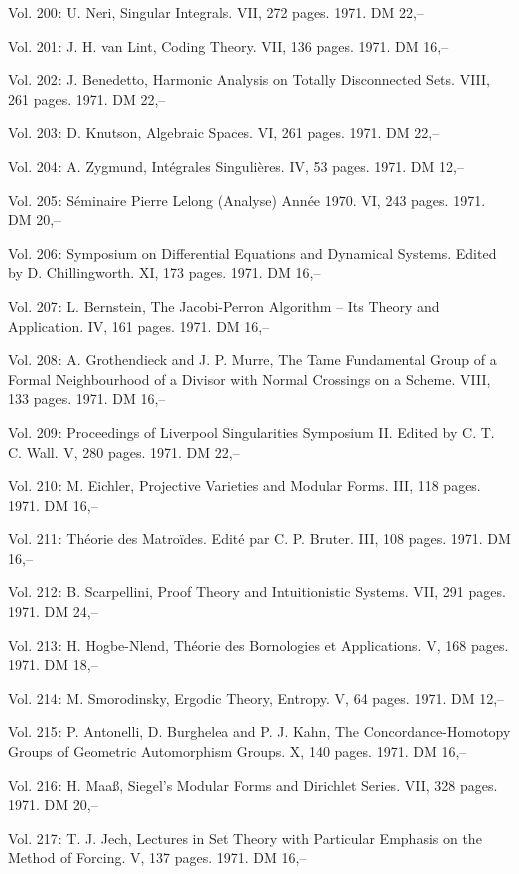 Vol. 200: U. Neri, Singular Integrals. VII, 272 pages. 1971. DM 22,--

Vol. 201: J. H. van Lint, Coding Theory. VII, 136 pages. 1971. DM 16,--

Vol. 202: J. Benedetto, Harmonic Analysis on Totally Disconnected Sets. VIII, 261 pages. 1971. DM 22,--

Vol. 203: D. Knutson, Algebraic Spaces. VI, 261 pages. 1971. DM 22,--

Vol. 204: A. Zygmund, Intégrales Singulières. IV, 53 pages. 1971. DM 12,--

Vol. 205: Séminaire Pierre Lelong (Analyse) Année 1970. VI, 243 pages. 1971. DM 20,--

Vol. 206: Symposium on Differential Equations and Dynamical Systems. Edited by D. Chillingworth. XI, 173 pages. 1971. DM 16,--

Vol. 207: L. Bernstein, The Jacobi-Perron Algorithm -- Its Theory and Application. IV, 161 pages. 1971. DM 16,--

Vol. 208: A. Grothendieck and J. P. Murre, The Tame Fundamental Group of a Formal Neighbourhood of a Divisor with Normal Crossings on a Scheme. VIII, 133 pages. 1971. DM 16,--

Vol. 209: Proceedings of Liverpool Singularities Symposium II. Edited by C. T. C. Wall. V, 280 pages. 1971. DM 22,--

Vol. 210: M. Eichler, Projective Varieties and Modular Forms. III, 118 pages. 1971. DM 16,--

Vol. 211: Théorie des Matroïdes. Edité par C. P. Bruter. III, 108 pages. 1971. DM 16,--

Vol. 212: B. Scarpellini, Proof Theory and Intuitionistic Systems. VII, 291 pages. 1971. DM 24,--

Vol. 213: H. Hogbe-Nlend, Théorie des Bornologies et Applications. V, 168 pages. 1971. DM 18,--

Vol. 214: M. Smorodinsky, Ergodic Theory, Entropy. V, 64 pages. 1971. DM 12,--

Vol. 215: P. Antonelli, D. Burghelea and P. J. Kahn, The Concordance-Homotopy Groups of Geometric Automorphism Groups. X, 140 pages. 1971. DM 16,--

Vol. 216: H. Maaß, Siegel's Modular Forms and Dirichlet Series. VII, 328 pages. 1971. DM 20,--

Vol. 217: T. J. Jech, Lectures in Set Theory with Particular Emphasis on the Method of Forcing. V, 137 pages. 1971. DM 16,--

